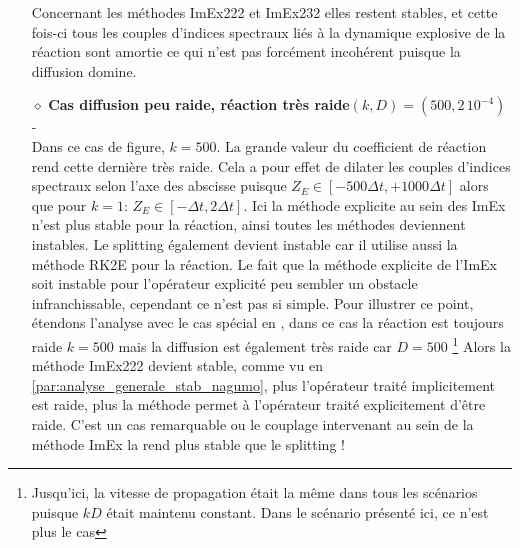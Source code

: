 \begin{itemize}
                        Concernant les méthodes ImEx222 et ImEx232 elles restent stables, et cette fois-ci tous les couples d'indices spectraux liés à la 
                        dynamique explosive de la réaction sont amortie ce qui n'est pas forcément incohérent puisque la diffusion domine.
                    \item[$\diamond$]\textbf{Cas diffusion peu raide, réaction très raide$(k,D)=(500,2\, 10^{-4})$} - \\
                        Dans ce cas de figure, $k=500$. La grande valeur du coefficient de réaction rend cette dernière très raide. 
                        Cela a pour effet de dilater les couples d'indices spectraux selon l'axe des abscisse puisque $Z_E \in [- 500 \Delta t, + 1000 \Delta t]$
                        alors que pour $k=1$: $Z_E \in [- \Delta t , 2\Delta t]$.
                        Ici la méthode explicite au sein des ImEx n'est plus stable pour la réaction, ainsi toutes les méthodes deviennent instables. 
                        Le splitting également devient instable car il utilise aussi la méthode RK2E pour la réaction. 
                        Le fait que la méthode explicite de l'ImEx soit instable pour l'opérateur explicité peu sembler un obstacle infranchissable,
                        cependant ce n'est pas si simple.
                        Pour illustrer ce point, étendons l'analyse avec le cas spécial en , dans ce cas la réaction est toujours raide $k=500$ mais la diffusion est également très raide car $D=500$
                        \footnote{Jusqu'ici, la vitesse de propagation était la même dans tous les scénarios puisque $kD$ était maintenu constant. Dans le scénario présenté ici, ce n'est plus le cas}
                        Alors la méthode ImEx222 devient stable, comme vu en \ref{par:analyse_generale_stab_nagumo}, plus l'opérateur traité implicitement est raide, 
                        plus la méthode permet à l'opérateur traité explicitement d'être raide. C'est un cas remarquable ou le couplage intervenant au sein de la méthode ImEx
                        la rend plus stable que le splitting !
                \end{itemize}
